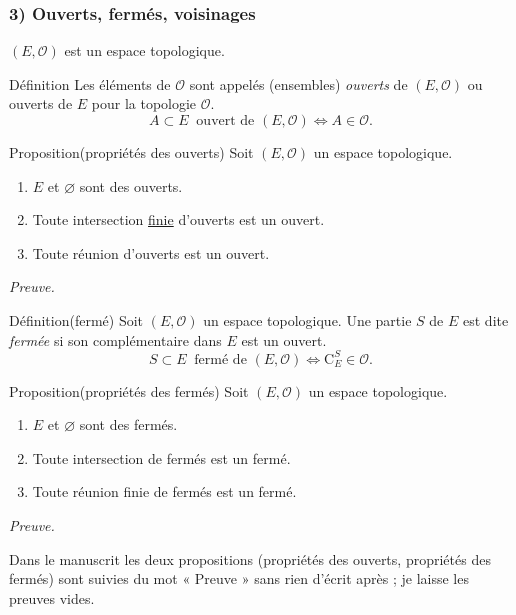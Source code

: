 \documentclass[11pt,a4paper]{article}
\newcommand{\Oo}{\mathscr{O}}
\newcommand{\cE}[1]{\mathrm{C}_E^{#1}}
\begin{document}
\subsubsection*{3) Ouverts, fermés, voisinages}

$(E,\Oo)$ est un espace topologique.

\begin{enonce}{Définition}{}
Les éléments de $\Oo$ sont appelés (ensembles) \emph{ouverts} de $(E,\Oo)$ ou ouverts de $E$ pour la topologie $\Oo$.
\[
  A\subset E\ \text{ ouvert de }(E,\Oo)\iff A\in\Oo .
\]
\end{enonce}

\begin{enonce}{Proposition}{(propriétés des ouverts)}
Soit $(E,\Oo)$ un espace topologique.
\begin{enumerate}[label=\textbf{\roman*)},leftmargin=1.2cm]
  \item $E$ et $\varnothing$ sont des ouverts.
  \item Toute intersection \underline{finie} d'ouverts est un ouvert.
  \item Toute réunion d'ouverts est un ouvert.
\end{enumerate}
\end{enonce}

\textit{Preuve.}

\begin{enonce}{Définition}{(fermé)}
Soit $(E,\Oo)$ un espace topologique. Une partie $S$ de $E$ est dite \emph{fermée} si son complémentaire dans $E$ est un ouvert.
\[
  S\subset E\ \text{ fermé de }(E,\Oo)\iff\cE{S}\in\Oo .
\]
\end{enonce}

\begin{enonce}{Proposition}{(propriétés des fermés)}
Soit $(E,\Oo)$ un espace topologique.
\begin{enumerate}[label=\textbf{\roman*)},leftmargin=1.2cm]
  \item $E$ et $\varnothing$ sont des fermés.
  \item Toute intersection de fermés est un fermé.
  \item Toute réunion finie de fermés est un fermé.
\end{enumerate}
\end{enonce}

\textit{Preuve.}

\begin{note}
Dans le manuscrit les deux propositions (propriétés des ouverts, propriétés des fermés) sont suivies du mot « Preuve » sans rien d'écrit après ; je laisse les preuves vides.
\end{note}
\end{document}
